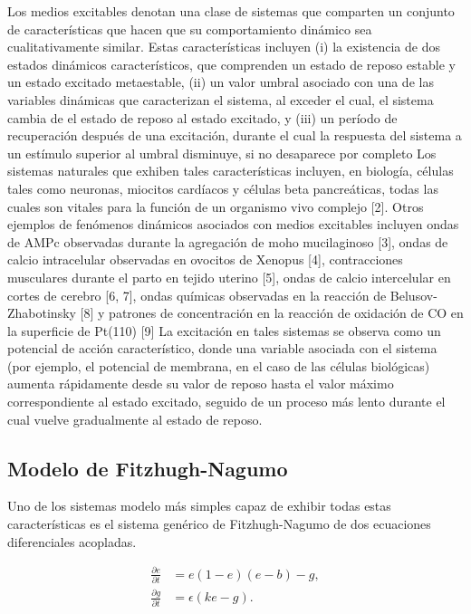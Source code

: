 Los medios excitables denotan una clase de sistemas que comparten un conjunto de características que hacen que su comportamiento dinámico sea cualitativamente similar. Estas características incluyen (i) la existencia de dos estados dinámicos característicos, que comprenden un estado de reposo estable y un estado excitado metaestable, (ii) un valor umbral asociado con una de las variables dinámicas que caracterizan el sistema, al exceder el cual, el sistema cambia de el estado de reposo al estado excitado, y (iii) un período de recuperación después de una excitación, durante el cual la respuesta del sistema a un estímulo superior al umbral disminuye, si no desaparece por completo
Los sistemas naturales que exhiben tales características incluyen, en biología, células tales como neuronas, miocitos cardíacos y células beta pancreáticas, todas las cuales son vitales para la función de un organismo vivo complejo [2]. Otros ejemplos de fenómenos dinámicos asociados con medios excitables incluyen ondas de AMPc observadas durante la agregación de moho mucilaginoso [3], ondas de calcio intracelular observadas en ovocitos de Xenopus [4], contracciones musculares durante el parto en tejido uterino [5], ondas de calcio intercelular en cortes de cerebro [6, 7], ondas químicas observadas en la reacción de Belusov-Zhabotinsky [8] y patrones de concentración en la reacción de oxidación de CO en la superficie de Pt(110) [9] La excitación en tales sistemas se observa como un potencial de acción característico, donde una variable asociada con el sistema (por ejemplo, el potencial de membrana, en el caso de las células biológicas) aumenta rápidamente desde su valor de reposo hasta el valor máximo correspondiente al estado excitado, seguido de un proceso más lento durante el cual vuelve gradualmente al estado de reposo.

\subsection{Modelo de Fitzhugh-Nagumo}\label{modelo_Fitzhugh-Nagumo}
Uno de los sistemas modelo más simples capaz de exhibir todas estas características es el sistema genérico de Fitzhugh-Nagumo de dos ecuaciones diferenciales acopladas.

\begin{align}\label{eq:75}
	\frac{\partial e}{\partial t}&=e(1-e)(e-b)-g,\\
	\frac{\partial g}{\partial t} &= \epsilon (ke-g).
\end{align}

